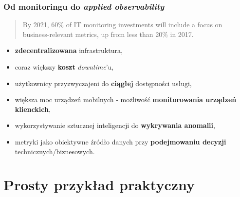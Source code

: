 \documentclass[]{beamer}
\begin{document}
\begin{frame}
  \frametitle{Od monitoringu do \textit{applied observability}}

  \begin{quote}
    By 2021, 60\% of IT monitoring investments will include a focus on business-relevant metrics, up from less than 20\% in 2017.
    \cite{gartner2}
  \end{quote}

  \begin{itemize}
    \item \textbf{zdecentralizowana} infrastruktura,
    \item coraz większy \textbf{koszt} \textit{downtime}'u,
    \item użytkownicy przyzwyczajeni do \textbf{ciągłej} dostępności usługi,
    \item większa moc urządzeń mobilnych - możliwość \textbf{monitorowania urządzeń klienckich},
    \item wykorzystywanie sztucznej inteligencji do \textbf{wykrywania anomalii},
    \item metryki jako obiektywne źródło danych przy \textbf{podejmowaniu decyzji} technicznych/biznesowych.
  \end{itemize}
\end{frame}

\section{Prosty przykład praktyczny}
\end{document}
